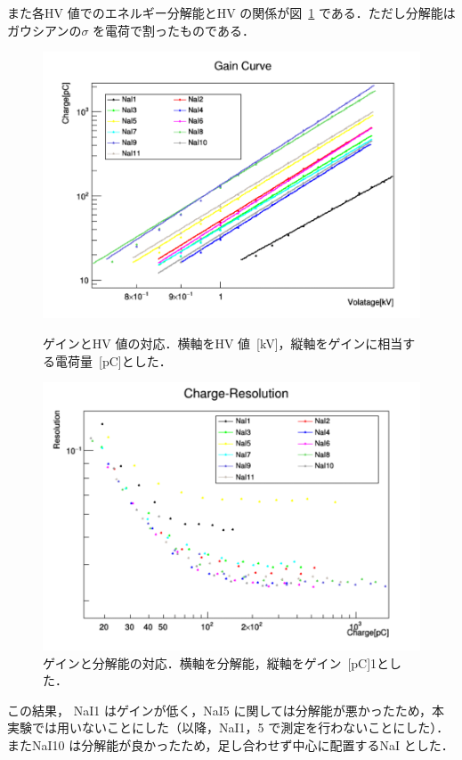 また各HV 値でのエネルギー分解能とHV の関係が図~\ref{resoHV} である．ただし分解能はガウシアンの$\sigma$ を電荷で割ったものである．
\begin{figure}[H]
\begin{minipage}{0.45\hsize}
\centering
\hspace*{-1em}
\includegraphics[width=1.1\textwidth]{figure/tajima/gain_curve.png}
\caption{ゲインとHV 値の対応．横軸をHV 値~[kV]，縦軸をゲインに相当する電荷量~[pC]とした．}
\label{GainHV}
\end{minipage}
\hfill
\begin{minipage}{0.45\hsize}
\centering
\includegraphics[width=1.1\textwidth]{figure/tajima/charge_resolution.png}
\caption{ゲインと分解能の対応．横軸を分解能，縦軸をゲイン~[pC]1とした．}
\label{resoHV}
\end{minipage}
\end{figure}
この結果， NaI1 はゲインが低く，NaI5 に関しては分解能が悪かったため，本実験では用いないことにした（以降，NaI1，5 で測定を行わないことにした）．
またNaI10 は分解能が良かったため，足し合わせず中心に配置するNaI とした．

